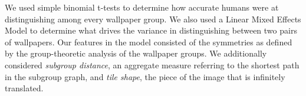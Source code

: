 We used simple binomial t-tests to determine how accurate humans were at distinguishing among every wallpaper group. We also used a Linear Mixed Effects Model to determine what drives the variance in distinguishing between two pairs of wallpapers. Our features in the model consisted of the symmetries as defined by the group-theoretic analysis of the wallpaper groups. We additionally considered \textit{subgroup distance}, an aggregate measure referring to the shortest path in the subgroup graph, and \textit{tile shape}, the piece of the image that is infinitely translated.